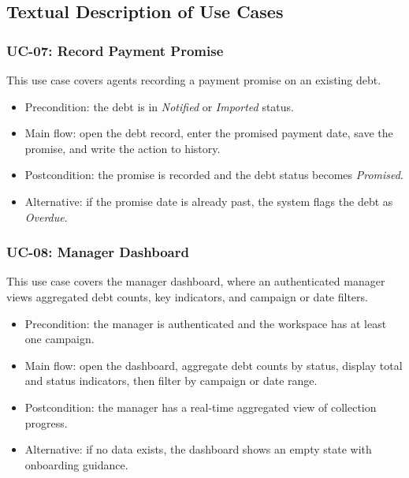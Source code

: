 ﻿\documentclass[12pt,a4paper]{report}
\begin{document}
\subsection{Textual Description of Use Cases}

\subsubsection{UC-07: Record Payment Promise}

\noindent This use case covers agents recording a payment promise on an existing debt.

\begin{itemize}
  \item Precondition: the debt is in \textit{Notified} or \textit{Imported} status.
  \item Main flow: open the debt record, enter the promised payment date, save the promise, and write the action to history.
  \item Postcondition: the promise is recorded and the debt status becomes \textit{Promised}.
  \item Alternative: if the promise date is already past, the system flags the debt as \textit{Overdue}.
\end{itemize}

\subsubsection{UC-08: Manager Dashboard}

\noindent This use case covers the manager dashboard, where an authenticated manager views aggregated debt counts, key indicators, and campaign or date filters.

\begin{itemize}
  \item Precondition: the manager is authenticated and the workspace has at least one campaign.
  \item Main flow: open the dashboard, aggregate debt counts by status, display total and status indicators, then filter by campaign or date range.
  \item Postcondition: the manager has a real-time aggregated view of collection progress.
  \item Alternative: if no data exists, the dashboard shows an empty state with onboarding guidance.
\end{itemize}

\end{document}
